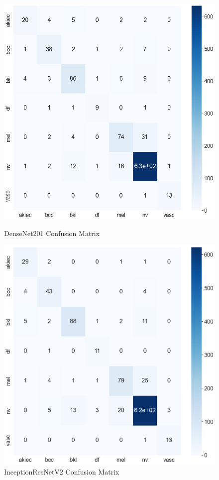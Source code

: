 \documentclass[sensors,article,submit,pdftex,moreauthors]{Definitions/mdpi}
\begin{document}
	\begin{figure}[!htb]
		\begin{minipage}{0.48\textwidth}
			\centering
			\includegraphics[width=1\linewidth]{Definitions/CM/dn201cm}
			\caption{DenseNet201 Confusion Matrix}\label{fig:densenet201cm}
		\end{minipage}\hfill
		\begin{minipage}{0.48\textwidth}
			\centering
			\includegraphics[width=1\linewidth]{Definitions/CM/irv2cm}
			\caption{InceptionResNetV2 Confusion Matrix}\label{fig:irv2cm}
		\end{minipage}
	\end{figure}
	
\end{document}
